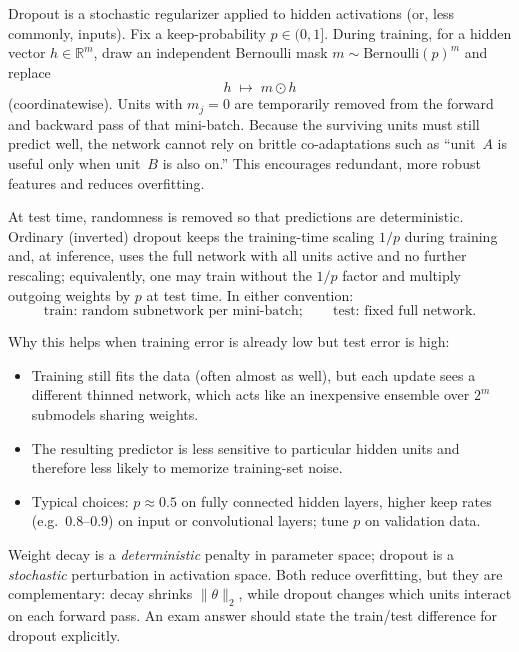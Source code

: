 \documentclass[11pt,a4paper]{article}
\theoremstyle{definition}
\begin{document}
Dropout is a stochastic regularizer applied to hidden activations (or, less commonly, inputs). Fix a keep-probability $p\in(0,1]$. During training, for a hidden vector $h\in\mathbb{R}^{m}$, draw an independent Bernoulli mask $m\sim\mathrm{Bernoulli}(p)^{m}$ and replace
\[
h \;\longmapsto\; m\odot h
\]
(coordinatewise). Units with $m_j=0$ are temporarily removed from the forward and backward pass of that mini-batch. Because the surviving units must still predict well, the network cannot rely on brittle co-adaptations such as ``unit~$A$ is useful only when unit~$B$ is also on.'' This encourages redundant, more robust features and reduces overfitting.

At test time, randomness is removed so that predictions are deterministic. Ordinary (inverted) dropout keeps the training-time scaling $1/p$ during training and, at inference, uses the full network with all units active and no further rescaling; equivalently, one may train without the $1/p$ factor and multiply outgoing weights by $p$ at test time. In either convention:
\[
\text{train: random subnetwork per mini-batch};
\qquad
\text{test: fixed full network}.
\]

Why this helps when training error is already low but test error is high:
\begin{itemize}
  \item Training still fits the data (often almost as well), but each update sees a different thinned network, which acts like an inexpensive ensemble over $2^{m}$ submodels sharing weights.
  \item The resulting predictor is less sensitive to particular hidden units and therefore less likely to memorize training-set noise.
  \item Typical choices: $p\approx 0.5$ on fully connected hidden layers, higher keep rates (e.g.\ $0.8$--$0.9$) on input or convolutional layers; tune $p$ on validation data.
\end{itemize}

\begin{remark}
Weight decay is a \emph{deterministic} penalty in parameter space; dropout is a \emph{stochastic} perturbation in activation space. Both reduce overfitting, but they are complementary: decay shrinks $\|\theta\|_2$, while dropout changes which units interact on each forward pass. An exam answer should state the train/test difference for dropout explicitly.
\end{remark}
\end{document}
